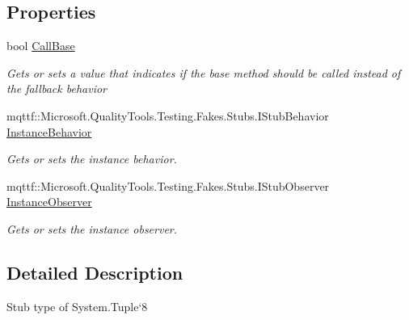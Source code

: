 \subsection*{Properties}
\begin{DoxyCompactItemize}
\item 
bool \hyperlink{class_system_1_1_fakes_1_1_stub_tuple_3_01_t1_00_01_t2_00_01_t3_00_01_t4_00_01_t5_00_01_t6_00_01_t7_00_01_t_rest_01_4_a8ccc3eeaf132df186ace052c196d36ec}{Call\-Base}
\begin{DoxyCompactList}\small\item\em Gets or sets a value that indicates if the base method should be called instead of the fallback behavior\end{DoxyCompactList}\item 
mqttf\-::\-Microsoft.\-Quality\-Tools.\-Testing.\-Fakes.\-Stubs.\-I\-Stub\-Behavior \hyperlink{class_system_1_1_fakes_1_1_stub_tuple_3_01_t1_00_01_t2_00_01_t3_00_01_t4_00_01_t5_00_01_t6_00_01_t7_00_01_t_rest_01_4_aa7c1b9c85d24448b1e1fb41f38ed35f2}{Instance\-Behavior}
\begin{DoxyCompactList}\small\item\em Gets or sets the instance behavior.\end{DoxyCompactList}\item 
mqttf\-::\-Microsoft.\-Quality\-Tools.\-Testing.\-Fakes.\-Stubs.\-I\-Stub\-Observer \hyperlink{class_system_1_1_fakes_1_1_stub_tuple_3_01_t1_00_01_t2_00_01_t3_00_01_t4_00_01_t5_00_01_t6_00_01_t7_00_01_t_rest_01_4_a3ccdfeb7a3331851e3cb42089161a18f}{Instance\-Observer}
\begin{DoxyCompactList}\small\item\em Gets or sets the instance observer.\end{DoxyCompactList}\end{DoxyCompactItemize}


\subsection{Detailed Description}
Stub type of System.\-Tuple`8



